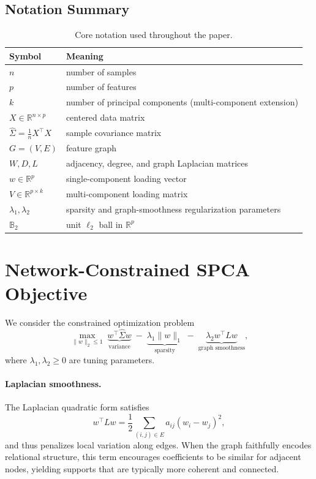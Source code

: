\documentclass[10pt,twocolumn,letterpaper]{article}
\theoremstyle{definition}
\newcommand{\R}{\mathbb{R}}
\newcommand{\Sigmahat}{\widehat{\Sigma}}
\begin{document}
\subsection{Notation Summary}
\begin{table}[t]
\centering
\caption{Core notation used throughout the paper.}
\label{tab:notation}
\small
\begin{tabularx}{\columnwidth}{@{}lY@{}}
\toprule
Symbol & Meaning \\
\midrule
$n$ & number of samples \\
$p$ & number of features \\
$k$ & number of principal components (multi-component extension) \\
$X\in\R^{n\times p}$ & centered data matrix \\
$\Sigmahat=\frac{1}{n}X^\top X$ & sample covariance matrix \\
$G=(V,E)$ & feature graph \\
$W,D,L$ & adjacency, degree, and graph Laplacian matrices \\
$w\in\R^p$ & single-component loading vector \\
$V\in\R^{p\times k}$ & multi-component loading matrix \\
$\lambda_1,\lambda_2$ & sparsity and graph-smoothness regularization parameters \\
$\mathbb{B}_2$ & unit $\ell_2$ ball in $\R^p$ \\
\bottomrule
\end{tabularx}
\normalsize
\end{table}

\section{\texorpdfstring{Network-Constrained SPCA\\ Objective}{Network-Constrained SPCA Objective}}
We consider the constrained optimization problem
\begin{equation}
\label{eq:main_obj}
\max_{\|w\|_2 \le 1}\;
\underbrace{w^\top \Sigmahat w}_{\text{variance}}
\;-\;
\underbrace{\lambda_1\|w\|_1}_{\text{sparsity}}
\;-\;
\underbrace{\lambda_2 w^\top L w}_{\text{graph smoothness}},
\end{equation}
where $\lambda_1,\lambda_2\ge 0$ are tuning parameters.

\paragraph{Laplacian smoothness.}
The Laplacian quadratic form satisfies
\begin{equation}
  w^\top L w = \frac{1}{2}\sum_{(i,j)\in E} a_{ij}(w_i-w_j)^2,
\end{equation}
and thus penalizes local variation along edges. When the graph faithfully encodes relational structure, this term encourages coefficients to be similar for adjacent nodes, yielding supports that are typically more coherent and connected.
\end{document}
